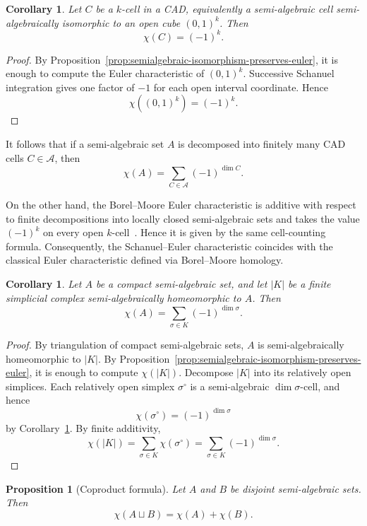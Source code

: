 \documentclass[11pt]{article}
\newtheorem{proposition}[theorem]{Proposition}
\newtheorem{corollary}[theorem]{Corollary}
\theoremstyle{remark}
\newcommand{\1}{\mathbf 1}
\begin{document}
\begin{corollary}
\label{cor:cell-euler-characteristic}
Let \(C\) be a \(k\)-cell in a CAD, equivalently a semi-algebraic cell
semi-algebraically isomorphic to an open cube \((0,1)^k\).  Then
\[
  \chi(C)=(-1)^k.
\]
\end{corollary}

\begin{proof}
By Proposition~\ref{prop:semialgebraic-isomorphism-preserves-euler}, it is
enough to compute the Euler characteristic of \((0,1)^k\).  Successive Schanuel integration gives one factor of \(-1\) for each open
interval coordinate.  Hence
\[
  \chi((0,1)^k)=(-1)^k.
\]
\end{proof}

It follows that if a semi-algebraic set \(A\) is decomposed into finitely many
CAD cells \(C\in\mathcal A\), then
\[
\chi(A)
=
\sum_{C\in\mathcal A}(-1)^{\dim C}.
\]

On the other hand, the Borel--Moore Euler characteristic is additive with
respect to finite decompositions into locally closed semi-algebraic sets and
takes the value \((-1)^k\) on every open \(k\)-cell~\cite{coste2005real}. Hence it is given by the
same cell-counting formula. Consequently, the Schanuel--Euler characteristic
coincides with the classical Euler characteristic defined via
Borel--Moore homology.

\begin{corollary}
\label{cor:compact-simplicial-euler-characteristic}
Let \(A\) be a compact semi-algebraic set, and let \(|K|\) be a finite
simplicial complex semi-algebraically homeomorphic to \(A\).  Then
\[
  \chi(A)
  =
  \sum_{\sigma\in K} (-1)^{\dim \sigma}.
\]
\end{corollary}

\begin{proof}
By triangulation of compact semi-algebraic sets, \(A\) is
semi-algebraically homeomorphic to \(|K|\).  By
Proposition~\ref{prop:semialgebraic-isomorphism-preserves-euler}, it is enough
to compute \(\chi(|K|)\).  Decompose \(|K|\) into its relatively open simplices.
Each relatively open simplex \(\sigma^\circ\) is a semi-algebraic
\(\dim\sigma\)-cell, and hence
\[
  \chi(\sigma^\circ)=(-1)^{\dim\sigma}
\]
by Corollary~\ref{cor:cell-euler-characteristic}.  By finite additivity,
\[
  \chi(|K|)
  =
  \sum_{\sigma\in K}\chi(\sigma^\circ)
  =
  \sum_{\sigma\in K}(-1)^{\dim\sigma}.
\]
\end{proof}

\begin{proposition}[Coproduct formula]
\label{prop:coproduct-formula}
Let \(A\) and \(B\) be disjoint semi-algebraic sets.  Then
\[
  \chi(A\sqcup B)=\chi(A)+\chi(B).
\]
\end{proposition}
\end{document}

